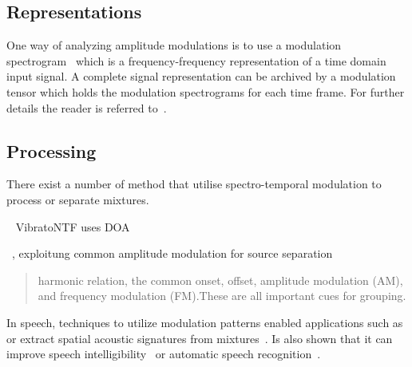 \subsection{Representations}
One way of analyzing amplitude modulations is to use a modulation spectrogram~\cite{greenberg97} which is a frequency-frequency
representation of a time domain input signal.
A complete signal representation can be archived by a modulation tensor which holds the modulation spectrograms for each time frame.
For further details the reader is referred to~\cite{barker15}.

\subsection{Processing}
There exist a number of method that utilise spectro-temporal modulation to process or separate mixtures.

~\cite{creager16} VibratoNTF uses DOA 

~\cite{li09}, exploitung common amplitude modulation for source separation

\cite{viste03}
\begin{quote}
harmonic relation, the common onset, offset, amplitude modulation (AM), and frequency modulation (FM).These are all important cues for grouping.  
\end{quote}

In speech, techniques to utilize modulation patterns enabled applications such as~\cite{mesgarani04} or extract spatial acoustic signatures from mixtures~\cite{sukittanon06}.
Is also shown that it can improve speech intelligibility~\cite{elhilali03} or automatic speech recognition~\cite{kingsbury98}.

